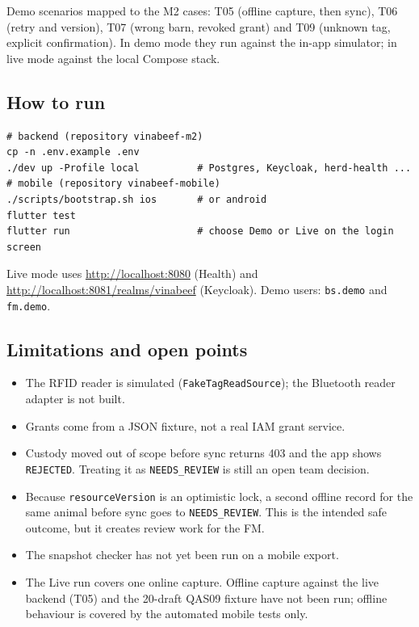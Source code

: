 Demo scenarios mapped to the M2 cases: T05 (offline capture, then
sync), T06 (retry and version), T07 (wrong barn, revoked grant) and
T09 (unknown tag, explicit confirmation). In demo mode they run against
the in-app simulator; in live mode against the local Compose stack.

\subsection{How to run}\label{sec:m2-mobile-run}

\begin{lstlisting}[basicstyle=\footnotesize\ttfamily,breaklines=true,columns=fullflexible]
# backend (repository vinabeef-m2)
cp -n .env.example .env
./dev up -Profile local          # Postgres, Keycloak, herd-health ...
# mobile (repository vinabeef-mobile)
./scripts/bootstrap.sh ios       # or android
flutter test
flutter run                      # choose Demo or Live on the login screen
\end{lstlisting}

Live mode uses \url{http://localhost:8080} (Health) and
\url{http://localhost:8081/realms/vinabeef} (Keycloak). Demo users:
\texttt{bs.demo} and \texttt{fm.demo}.

\subsection{Limitations and open points}\label{sec:m2-mobile-limits}

\begin{itemize}
\item The RFID reader is simulated (\texttt{FakeTagReadSource}); the
Bluetooth reader adapter is not built.
\item Grants come from a JSON fixture, not a real IAM grant service.
\item Custody moved out of scope before sync returns 403 and the app
shows \texttt{REJECTED}. Treating it as \texttt{NEEDS\_REVIEW} is still
an open team decision.
\item Because \texttt{resourceVersion} is an optimistic lock, a second
offline record for the same animal before sync goes to
\texttt{NEEDS\_REVIEW}. This is the intended safe outcome, but it
creates review work for the FM.
\item The snapshot checker has not yet been run on a mobile export.
\item The Live run covers one online capture. Offline capture against
the live backend (T05) and the 20-draft QAS09 fixture have not been run;
offline behaviour is covered by the automated mobile tests only.
\end{itemize}
